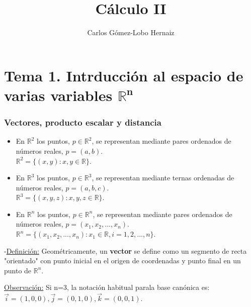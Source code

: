 \documentclass[12pt, titlepage]{article}
\begin{document}
\title {Cálculo II}
\author {Carlos Gómez-Lobo Hernaiz}
\date{}
\maketitle


\part* {Tema 1. Intrducción al espacio de varias variables $\displaystyle \mathbf{\mathbb{R}^n}$}

\section {Vectores, producto escalar y distancia}

\begin{itemize}

\item En $\displaystyle \mathbb{R}^2$ los puntos, $p \in \displaystyle \mathbb{R}^2$, se representan mediante pares ordenados de números reales, $p=(a, b)$. \\$\mathbb{R}^2 = \{(x, y):x, y \in \mathbb{R}\}$.

\item En $\displaystyle \mathbb{R}^3$ los puntos, $p \in\displaystyle  \mathbb{R}^3$, se representan mediante ternas ordenadas de números reales, $p=(a, b, c)$. \\$\displaystyle \mathbb{R}^3 = \{(x, y, z):x, y, z \in \displaystyle \mathbb{R}\}$.

\item En $\mathbb{R}^n$ los puntos, $p \in \displaystyle \mathbb{R}^n$, se representan mediante pares ordenados de números reales, $p=(x_1, x_2, ..., x_n)$.\\ $\displaystyle \mathbb{R}^n = \{(x_1, x_2, ..., x_n):x_1 \in \displaystyle \mathbb{R}, i=1, 2, ..., n\}$.

\end{itemize}

\noindent -\underline{Definición:} Geométricamente, un \textbf{vector} se define como un segmento de recta "orientado" con punto inicial en el origen de coordenadas y punto final en un punto de $\displaystyle \mathbb{R}^n$.

\vspace{3mm}

\noindent *\underline{Observación:} Si n=3, la notación habitual parala base canónica es: \\$\vec{i}=(1, 0, 0), \vec{j}=(0, 1, 0), \vec{k}=(0, 0, 1)$.
\end{document}
